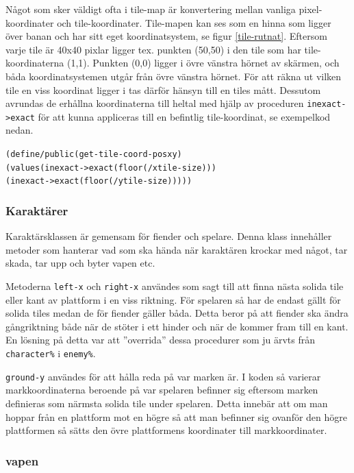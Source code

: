 \documentclass{scrartcl}
\newcommand{\code}[1]%
{\texttt{#1}}
\begin{document}
Något som sker väldigt ofta i tile-map är konvertering mellan vanliga pixel-koordinater och tile-koordinater. Tile-mapen kan ses som en hinna som ligger över banan och har sitt eget koordinatsystem, se figur \ref{tile-rutnat}. Eftersom varje tile är 40x40 pixlar ligger tex. punkten (50,50) i den tile som har tile-koordinaterna (1,1). Punkten (0,0) ligger i övre vänstra hörnet av skärmen, och båda koordinatsystemen utgår från övre vänstra hörnet. För att räkna ut vilken tile en viss koordinat ligger i tas därför hänsyn till en tiles mått. Dessutom avrundas de erhållna koordinaterna till heltal med hjälp av proceduren \code{inexact->exact} för att kunna appliceras till en befintlig tile-koordinat, se exempelkod nedan.

\begin{alltt}
(define/public (get-tile-coord-pos x y) 
      (values (inexact->exact (floor (/ x tile-size)))
              (inexact->exact (floor (/ y tile-size)))))
\end{alltt}         


\subsubsection{Karaktärer}

Karaktärsklassen är gemensam för fiender och spelare. Denna klass innehåller metoder som hanterar vad som ska hända när karaktären krockar med något, tar skada, tar upp och byter vapen etc.

Metoderna \code{left-x} och \code{right-x} användes som sagt till att finna nästa solida tile eller kant av plattform i en viss riktning. För spelaren så har de endast gällt för solida tiles medan de för fiender gäller båda. Detta beror på att fiender ska ändra gångriktning både när de stöter i ett hinder och när de kommer fram till en kant. En lösning på detta var att ''overrida'' dessa procedurer som ju ärvts från \code{character\%} i \code{enemy\%}.

\code{ground-y} användes för att hålla reda på var marken är. I koden så varierar markkoordinaterna beroende på var spelaren befinner sig eftersom marken definieras som närmsta solida tile under spelaren. Detta innebär att om man hoppar från en plattform mot en högre så att man befinner sig ovanför den högre plattformen så sätts den övre plattformens koordinater till markkoordinater. 



\subsubsection{vapen}
\end{document}
